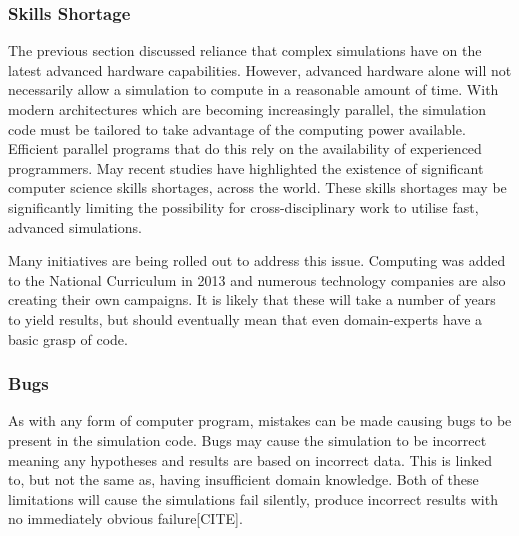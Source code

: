 \documentclass{UoYCSproject}
\begin{document}
\subsubsection{Skills Shortage}
\label{skills_shortage}
The previous section discussed reliance that complex simulations have on the latest advanced hardware capabilities.
However, advanced hardware alone will not necessarily allow a simulation to compute in a reasonable amount of time. 
With modern architectures which are becoming increasingly parallel, the simulation code must be tailored to take advantage of the computing power available.
Efficient parallel programs that do this rely on the availability of experienced programmers.
May recent studies have highlighted the existence of significant computer science skills shortages, across the world\cite{digital_skills_uk, microsoft_blog}.
These skills shortages may be significantly limiting the possibility for cross-disciplinary work to utilise fast, advanced simulations.



Many initiatives are being rolled out to address this issue.
Computing was added to the National Curriculum in 2013\cite{national_curriculum, teacher_training} and numerous technology companies are also creating their own campaigns\cite{apple_education, microsoft_education}.
It is likely that these will take a number of years to yield results, but should eventually mean that even domain-experts have a basic grasp of code.

\subsubsection{Bugs}
As with any form of computer program, mistakes can be made causing bugs to be present in the simulation code.
Bugs may cause the simulation to be incorrect meaning any hypotheses and results are based on incorrect data.
This is linked to, but not the same as, having insufficient domain knowledge.
Both of these limitations will cause the simulations fail silently, produce incorrect results with no immediately obvious failure[CITE].
\end{document}
